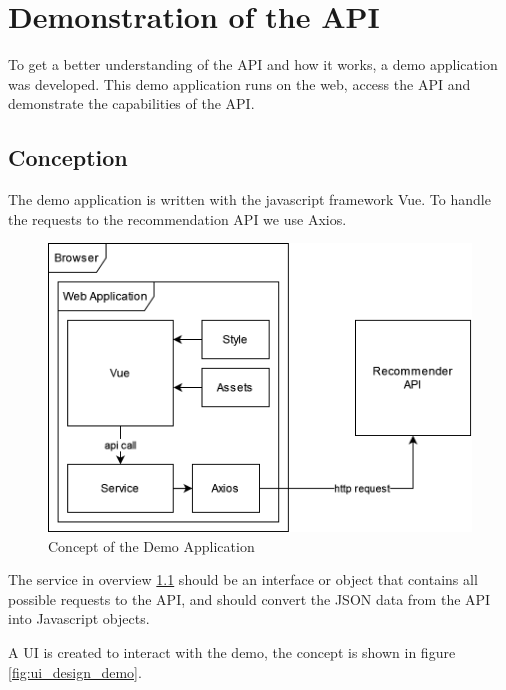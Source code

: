 \chapter{Demonstration of the API}

\label{chap:demo}

To get a better understanding of the API and how it works, a demo application was developed. This demo application runs on the web, access the API and demonstrate the capabilities of the API.

\section{Conception}

\label{sec:demo_concept}

The demo application is written with the javascript framework Vue. To handle the requests to the recommendation API we use Axios.

\begin{figure}[h]
\centering
\includegraphics[width=\textwidth]{images/Demo_concept.drawio.png}
\caption{\label{fig:demo_concept}Concept of the Demo Application}
\end{figure}

\newpage

The service in overview \ref{fig:demo_concept} should be an interface or object that contains all possible requests to the API, and should convert the JSON data from the API into Javascript objects.

A UI is created to interact with the demo, the concept is shown in figure \ref{fig:ui_design_demo}.

